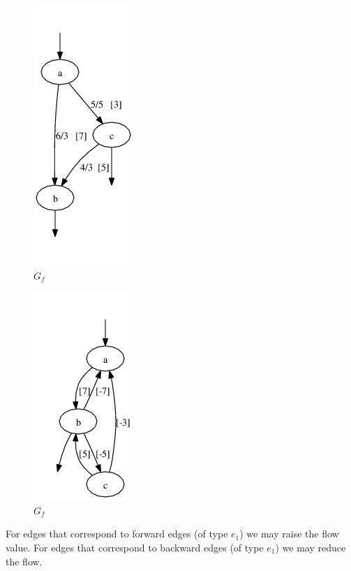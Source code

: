 \begin{example}

\begin{figure}[h]
\includegraphics[scale=0.5]{diagrams/graph5_10}
\caption{$G{_f}$}
\label{fig:G12}
\end{figure}

\begin{figure}[h]
\includegraphics[scale=0.5]{diagrams/graph5_11}
\caption{$G{_f}$}
\label{fig:G13}
\end{figure}


For edges that correspond to forward edges (of type $e{_1}$) we may raise the flow value.
For edges that correspond to backward edges (of type $e{_1}$) we may reduce the flow.

\end{example}